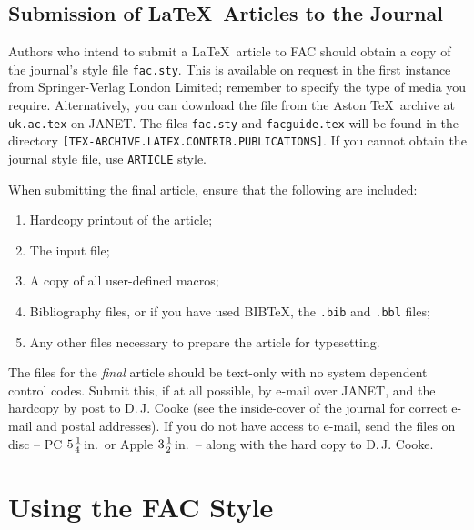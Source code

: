 \subsection{Submission of \LaTeX\ Articles to the Journal}

Authors who intend to submit a \LaTeX\ article to FAC should obtain a
copy of the journal's style file \verb"fac.sty". This is available on
request in the first instance from  Springer-Verlag London Limited; remember to
specify the type of media you require. Alternatively, you can download
the file from the Aston \TeX\ archive at \verb"uk.ac.tex" on JANET. The files
\verb"fac.sty" and \verb"facguide.tex" will be found in the directory
\verb"[TEX-ARCHIVE.LATEX.CONTRIB.PUBLICATIONS]". If you
cannot obtain the journal style file, use \verb"ARTICLE" style.

When submitting the final article, ensure that  the following are included:
\begin{enumerate}
 \item Hardcopy printout of the article;
 \item The input file;
 \item A copy of all user-defined macros;
 \item Bibliography files, or if you have used BIB\TeX, the \verb".bib"
                 and \verb".bbl" files;
 \item Any other files necessary to prepare the article
           for typesetting.
\end{enumerate}
The files for the {\em final\/} article should be text-only with no
system dependent control codes. Submit this, if at all possible, by
e-mail over JANET, and the hardcopy by post to D.\,J. Cooke (see the
inside-cover of the journal for correct e-mail and postal addresses).
If you do not have access to e-mail, send the files on disc -- PC $5
{1\over4\,}$in.\ or Apple $3 {1\over 2\,}$in.\ -- along with the hard copy to D.\,J. Cooke.

\section{Using the FAC Style}

